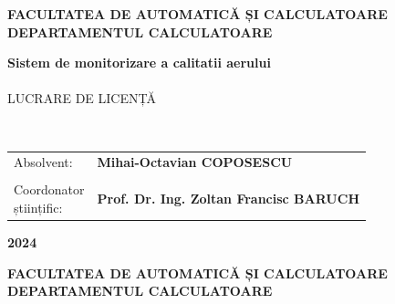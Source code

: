 \pagestyle{fancy}
\setlength{\voffset}{-10pt}
\setlength\headheight{70.0pt}
\renewcommand{\headrulewidth}{0pt}
\cfoot{}
\lfoot{}
\rfoot{}
\renewcommand{\thesisauthor}{Mihai-Octavian COPOSESCU}    %
\renewcommand{\thesismonth}{Iulie}     %
\renewcommand{\thesisyear}{2024}      %
\renewcommand{\thesistitle}{Sistem de monitorizare a calitatii aerului} %
\renewcommand{\thesissupervisor}{Prof. Dr. Ing. Zoltan Francisc BARUCH} %
\newcommand{\makeThesisTitle}{\textbf{\thesistitletypesize \thesistitle}}
\newcommand{\makeThesisType}{\thesistypetypesize \thesistype}
\newcommand{\department}{\sffamily\bfseries\small FACULTATEA DE AUTOMATICĂ ȘI CALCULATOARE\\
	DEPARTAMENTUL CALCULATOARE} 
\renewcommand{\thesistype}{LUCRARE DE LICENȚĂ}
\newcommand{\uline}[1]{\rule[0pt]{#1}{0.4pt}}
\begin{center}
	{\department}
	
	\vspace{4cm}
	\makeThesisTitle
	~\\~\\
	
	\makeThesisType
	
	~\\\vspace{6.5cm}
	
	\begin{tabular}{p{.3\linewidth}p{.5\linewidth}}
		{\hfill Absolvent:} & {\bf \thesisauthor} \\
		&\\
		{\parbox[t]{\linewidth}{\qquad\qquad\qquad Coordonator\\\hspace*{3.2cm}științific:}}& {\bf \thesissupervisor}\\
	\end{tabular}
	
	\vspace{3cm}
	{\bf \thesisyear}
\end{center}
\newpage
\begin{center}
	{\department}
\end{center}
\vspace{0.5cm}

